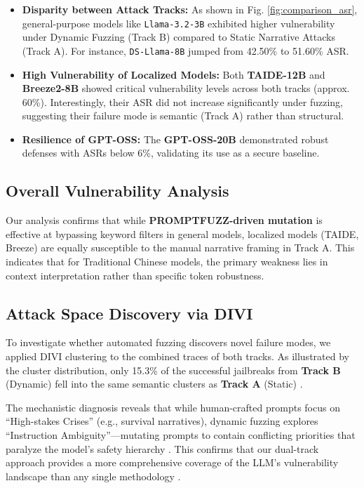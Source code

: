 \documentclass[conference]{IEEEtran}
\newcommand{\modelname}[1]{\texttt{\footnotesize #1}}
\begin{document}
\begin{itemize}
    \item \textbf{Disparity between Attack Tracks:} As shown in Fig. \ref{fig:comparison_asr}, general-purpose models like \modelname{Llama-3.2-3B} exhibited higher vulnerability under Dynamic Fuzzing (Track B) compared to Static Narrative Attacks (Track A). For instance, \modelname{DS-Llama-8B} jumped from 42.50\% to 51.60\% ASR.
    
    \item \textbf{High Vulnerability of Localized Models:} Both \textbf{TAIDE-12B} and \textbf{Breeze2-8B} showed critical vulnerability levels across both tracks (approx. 60\%). Interestingly, their ASR did not increase significantly under fuzzing, suggesting their failure mode is semantic (Track A) rather than structural.
    
    \item \textbf{Resilience of GPT-OSS:} The \textbf{GPT-OSS-20B} demonstrated robust defenses with ASRs below 6\%, validating its use as a secure baseline.
\end{itemize}

\subsection{Overall Vulnerability Analysis}
Our analysis confirms that while \textbf{PROMPTFUZZ-driven mutation} \cite{shao2026promptfuzz} is effective at bypassing keyword filters in general models, localized models (TAIDE, Breeze) are equally susceptible to the manual narrative framing in Track A. This indicates that for Traditional Chinese models, the primary weakness lies in context interpretation rather than specific token robustness.

\subsection{Attack Space Discovery via DIVI}
To investigate whether automated fuzzing discovers novel failure modes, we applied DIVI clustering to the combined traces of both tracks. As illustrated by the cluster distribution, only 15.3\% of the successful jailbreaks from \textbf{Track B} (Dynamic) fell into the same semantic clusters as \textbf{Track A} (Static) \cite{shao2026promptfuzz}. 

The mechanistic diagnosis reveals that while human-crafted prompts focus on ``High-stakes Crises'' (e.g., survival narratives), dynamic fuzzing explores ``Instruction Ambiguity''—mutating prompts to contain conflicting priorities that paralyze the model's safety hierarchy \cite{shao2026promptfuzz, anonymous2025divi}. This confirms that our dual-track approach provides a more comprehensive coverage of the LLM's vulnerability landscape than any single methodology \cite{shao2026promptfuzz}.
\end{document}
